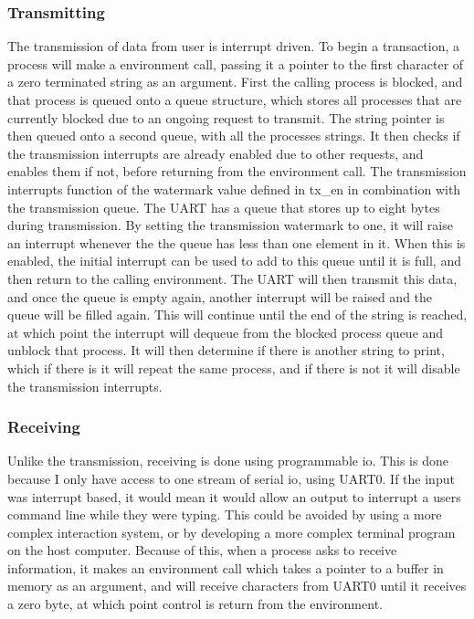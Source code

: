 \subsubsection{Transmitting}
The transmission of data from user is interrupt driven. To begin a transaction, a process will make a environment call, passing it a pointer to the first character of a zero terminated string as an argument. First the calling process is blocked, and that process is queued onto a queue structure, which stores all processes that are currently blocked due to an ongoing request to transmit. The string pointer is then queued onto a second queue, with all the processes strings. It then checks if the transmission interrupts are already enabled due to other requests, and enables them if not, before returning from the environment call. The transmission interrupts function of the watermark value defined in tx\_en in combination with the transmission queue. The UART has a queue that stores up to eight bytes during transmission. By setting the transmission watermark to one, it will raise an interrupt whenever the the queue has less than one element in it. When this is enabled, the initial interrupt can be used to add to this queue until it is full, and then return to the calling environment. The UART will then transmit this data, and once the queue is empty again, another interrupt will be raised and the queue will be filled again. This will continue until the end of the string is reached, at which point the interrupt will dequeue from the blocked process queue and unblock that process. It will then determine if there is another string to print, which if there is it will repeat the same process, and if there is not it will disable the transmission interrupts.
\subsubsection{Receiving}
Unlike the transmission, receiving is done using programmable \ac{io}. This is done because I only have access to one stream of serial \ac{io}, using UART0. If the input was interrupt based, it would mean it would allow an output to interrupt a users command line while they were typing. This could be avoided by using a more complex interaction system, or by developing a more complex terminal program on the host computer. Because of this, when a process asks to receive information, it makes an environment call which takes a pointer to a buffer in memory as an argument, and will receive characters from UART0 until it receives a zero byte, at which point control is return from the environment.
